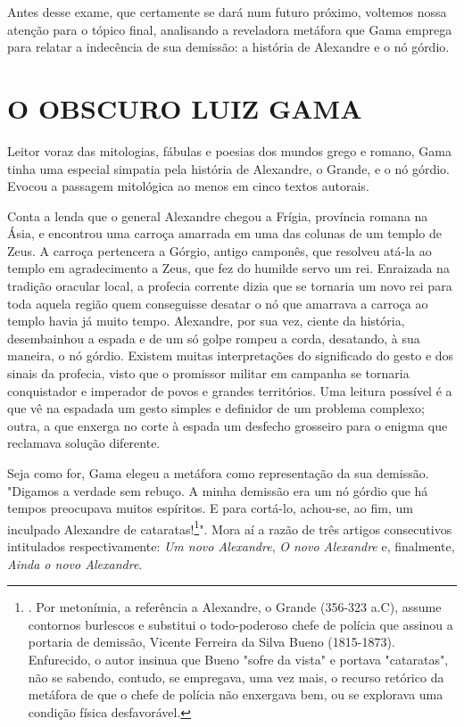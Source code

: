 Antes desse exame, que certamente se dará num futuro próximo, voltemos
nossa atenção para o tópico final, analisando a reveladora metáfora que
Gama emprega para relatar a indecência de sua demissão: a história de
Alexandre e o nó górdio.

\section{O OBSCURO LUIZ GAMA}

Leitor voraz das mitologias, fábulas e poesias dos mundos grego e
romano, Gama tinha uma especial simpatia pela história de Alexandre, o
Grande, e o nó górdio. Evocou a passagem mitológica ao menos em cinco
textos autorais.

Conta a lenda que o general Alexandre chegou a Frígia, província romana
na Ásia, e encontrou uma carroça amarrada em uma das colunas de um
templo de Zeus. A carroça pertencera a Górgio, antigo camponês, que
resolveu atá-la ao templo em agradecimento a Zeus, que fez do humilde
servo um rei. Enraizada na tradição oracular local, a profecia corrente
dizia que se tornaria um novo rei para toda aquela região quem
conseguisse desatar o nó que amarrava a carroça ao templo havia já muito
tempo. Alexandre, por sua vez, ciente da história, desembainhou a espada
e de um só golpe rompeu a corda, desatando, à sua maneira, o nó górdio.
Existem muitas interpretações do significado do gesto e dos sinais da
profecia, visto que o promissor militar em campanha se tornaria
conquistador e imperador de povos e grandes territórios. Uma leitura
possível é a que vê na espadada um gesto simples e definidor de um
problema complexo; outra, a que enxerga no corte à espada um desfecho
grosseiro para o enigma que reclamava solução diferente.

Seja como for, Gama elegeu a metáfora como representação da sua
demissão. "Digamos a verdade sem rebuço. A minha demissão era um nó
górdio que há tempos preocupava muitos espíritos. E para cortá-lo,
achou-se, ao fim, um inculpado Alexandre de cataratas!\footnote{. Por
  metonímia, a referência a Alexandre, o Grande (356-323 a.C), assume
  contornos burlescos e substitui o todo-poderoso chefe de polícia que
  assinou a portaria de demissão, Vicente Ferreira da Silva Bueno
  (1815-1873). Enfurecido, o autor insinua que Bueno "sofre da vista" e
  portava "cataratas", não se sabendo, contudo, se empregava, uma vez
  mais, o recurso retórico da metáfora de que o chefe de polícia não
  enxergava bem, ou se explorava uma condição física desfavorável.}".
Mora aí a razão de três artigos consecutivos intitulados
respectivamente: \emph{Um novo Alexandre}, \emph{O novo Alexandre} e,
finalmente, \emph{Ainda o novo Alexandre}.


